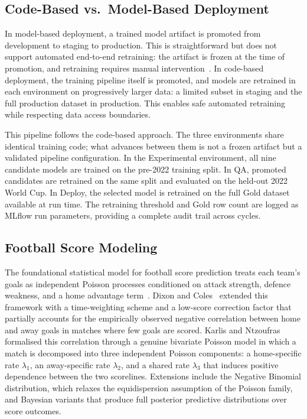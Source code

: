 \documentclass[conference]{IEEEtran}
\begin{document}
\subsection{Code-Based vs.\ Model-Based Deployment}

In model-based deployment, a trained model artifact is promoted from development to
staging to production. This is straightforward but does not support automated end-to-end
retraining: the artifact is frozen at the time of promotion, and retraining requires
manual intervention~\cite{databricks_bigbook}. In code-based deployment, the training
pipeline itself is promoted, and models are retrained in each environment on progressively
larger data: a limited subset in staging and the full production dataset in production.
This enables safe automated retraining while respecting data access boundaries.

This pipeline follows the code-based approach. The three environments share identical
training code; what advances between them is not a frozen artifact but a validated pipeline
configuration. In the Experimental environment, all nine candidate models are trained on
the pre-2022 training split. In QA, promoted candidates are retrained on the same split
and evaluated on the held-out 2022 World Cup. In Deploy, the selected model is retrained
on the full Gold dataset available at run time. The retraining threshold and Gold row count
are logged as MLflow run parameters, providing a complete audit trail across cycles.

\subsection{Football Score Modeling}

The foundational statistical model for football score prediction treats each team's goals
as independent Poisson processes conditioned on attack strength, defence weakness, and a
home advantage term~\cite{maher1982modelling}. Dixon and Coles~\cite{dixon1997modelling}
extended this framework with a time-weighting scheme and a low-score correction factor
that partially accounts for the empirically observed negative correlation between home
and away goals in matches where few goals are scored.
Karlis and Ntzoufras~\cite{karlis2003analysis} formalised this correlation through a
genuine bivariate Poisson model in which a match is decomposed into three independent
Poisson components: a home-specific rate $\lambda_1$, an away-specific rate $\lambda_2$,
and a shared rate $\lambda_3$ that induces positive dependence between the two scorelines.
Extensions include the Negative Binomial distribution, which relaxes the equidispersion
assumption of the Poisson family, and Bayesian variants that produce full posterior
predictive distributions over score outcomes.
\end{document}
